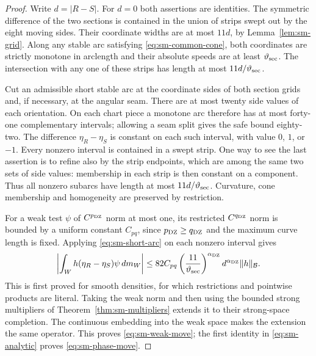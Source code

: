 \begin{proof}
Write $d=|R-S|$. For $d=0$ both assertions are identities. The
symmetric difference of the two sections is contained in the union
of strips swept out by the eight moving sides. Their coordinate
widths are at most $11d$, by Lemma~\ref{lem:sm-grid}. Along any
stable arc satisfying \eqref{eq:sm-common-cone}, both coordinates
are strictly monotone in arclength and their absolute speeds are
at least $\vartheta_{\rm sec}$. The intersection with any one
of these strips has length at most $11d/\vartheta_{\rm sec}$.

Cut an admissible short stable arc at the coordinate sides of both
section grids and, if necessary, at the angular seam. There are
at most twenty side values of each orientation. On each chart
piece a monotone arc therefore has at most forty-one complementary
intervals; allowing a seam split gives the safe bound eighty-two.
The difference $\eta_R-\eta_S$ is constant on each such interval,
with value $0$, $1$, or $-1$. Every nonzero interval is contained
in a swept strip. One way to see the last assertion is to refine
also by the strip endpoints, which are among the same two sets
of side values: membership in each strip is then constant on a
component. Thus all nonzero subarcs have length at most
$11d/\vartheta_{\rm sec}$. Curvature, cone membership and
homogeneity are preserved by restriction.

For a weak test $\psi$ of $C^{p_{\rm DZ}}$ norm at most one,
its restricted $C^{q_{\rm DZ}}$ norm is bounded by a uniform
constant $C_{pq}$, since $p_{\rm DZ}\ge q_{\rm DZ}$ and the
maximum curve length is fixed. Applying
\eqref{eq:sm-short-arc} on each nonzero interval gives
\[
 \left|\int_W h(\eta_R-\eta_S)\psi\,dm_W\right|
 \le82 C_{pq}\left(\frac{11}{\vartheta_{\rm sec}}\right)^{\alpha_{\rm DZ}}
             d^{\alpha_{\rm DZ}}\|h\|_{\mathcal B}.
\]
This is first proved for smooth densities, for which restrictions
and pointwise products are literal. Taking the weak norm and then
using the bounded strong multipliers of
Theorem~\ref{thm:sm-multipliers} extends it to their strong-space
completion. The continuous embedding into the weak space makes
the extension the same operator. This proves
\eqref{eq:sm-weak-move}; the first identity in
\eqref{eq:sm-analytic} proves \eqref{eq:sm-phase-move}.
\end{proof}

